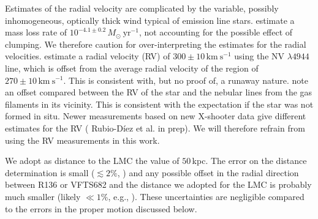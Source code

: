\documentclass[apjl,twocolumn]{emulateapj}
\newcommand{\kms}{{\,\mathrm{km\ s^{-1}}}}
\begin{document}
Estimates of the radial velocity are complicated by the variable,
possibly inhomogeneous, optically thick wind  typical of emission line
stars. \citet{bestenlehner:11} estimate a mass loss rate of
$10^{-4.1\pm0.2}\,M_\odot \ \mathrm{yr}^{-1}$, not accounting for the
possible effect of clumping.  We therefore caution
for over-interpreting the estimates for the radial velocities. %
\citet{bestenlehner:11}  estimate a radial velocity (RV) of
$300\pm10\kms$ using the  N{\footnotesize V} $\lambda4944$ line, which
is offset from the average radial velocity of the region of
$270\pm10\kms$. This is consistent with, but no proof of, a runaway
nature.  \cite{bressert:12} note an offset compared between the RV of
the star and the nebular lines from the gas filaments in its
vicinity. This is consistent with the expectation if the star was not
formed in situ. Newer measurements based on new X-shooter data give different estimates for the RV ({\color{blue} Rubio-D{\' i}ez et al. in prep}).
We will therefore refrain from using the RV measurements in this work. 

We adopt as distance to the LMC the value of $50$\,kpc. The error on
the distance determination is small ($\lesssim2\%$,
\citealt{pietrzynski:13}) and any possible offset in the radial direction between R136 or VFTS682 and the distance we adopted for the LMC is probably much smaller (likely $\ll 1\%$, e.g., \citealt{Luks+1992}). These uncertainties are negligible compared to the errors in the proper motion discussed below.  

\end{document}
